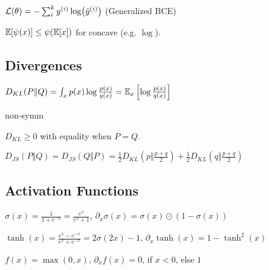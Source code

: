 \begin{definition}
    \(\mathcal{L}(\theta) = - \sum_i^k y^{(i)} \log (\hat y^{(i)})\) (Generalized BCE)
\end{definition}

\begin{definition}
    \(\mathbb{E}[\psi(x)] \leq \psi(\mathbb{E}[x])\) for concave (e.g. \(\log\)).
\end{definition}

\subsection{Divergences}

    \(D_{KL}(P \Vert Q) = \int_x p(x) \log \frac{p(x)}{q(x)} = \mathbb{E}_x\left[\log\frac{p(x)}{q(x)}\right]\)

    \begin{itemize*}
        \item non-symm
        \item \(D_{KL} \geq 0\) with equality when \(P = Q\).
    \end{itemize*}

    \(D_{JS}(P \Vert Q) = D_{JS}(Q \Vert P) = \frac 1 2 D_{KL}(p \Vert \frac{p+q}{2})+ \frac 1 2 D_{KL}(q \Vert \frac{p + q}{2})\)

\subsection{Activation Functions}

\begin{definition}[Sigmoid]
    \(\sigma(x) = \frac{1}{1 + e^{-x}} = \frac{e^x}{e^x + 1}\), \(\partial_x \sigma(x) = \sigma(x) \odot (1 - \sigma(x))\)
\end{definition}

\begin{definition}[Tanh]
    \(\tanh(x) = \frac{e^x - e^{-x}}{e^x + e^{-x}} = 2\sigma(2x) - 1\), \(\partial_x \tanh(x) = 1 - \tanh^2(x)\)
\end{definition}

\begin{definition}[Relu]
    \(f(x) = \max(0, x)\), \(\partial_x f(x) = 0\), if \(x < 0\), else \(1\)
\end{definition}

